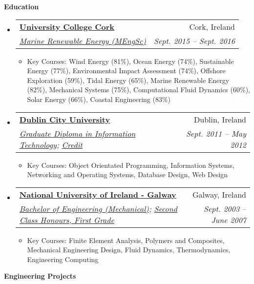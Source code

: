 \documentclass[letterpaper,11pt]{article}
\makeatletter
\newcommand{\resitem}[1]{\item #1 \vspace{-2pt}}
\newcommand{\resheading}[1]{{\large \colorbox{mygrey}{\begin{minipage}{\textwidth}{\textbf{#1 \vphantom{p\^{E}}}}\end{minipage}}}}
\newcommand{\ressubheading}[4]{
\begin{tabular*}{6.5in}{l@{\extracolsep{\fill}}r}
		\textbf{#1} & #2 \\
		\textit{#3} & \textit{#4} \\
\end{tabular*}\vspace{-6pt}}
\makeatother
\begin{document}

\resheading{Education}
	\begin{itemize}
    \item
      \ressubheading{\href{http://www.ucc.ie}{University College Cork}}{Cork, Ireland}{\href{http://www.ucc.ie/en/ckr51/}{Marine Renewable Energy (MEngSc)}}
      {Sept. 2015 -- Sept. 2016}
        { \footnotesize
        \begin{itemize}
        \resitem{Key Courses: Wind Energy (81\%), Ocean Energy (74\%), Sustainable Energy (77\%), Environmental Impact Assessment (74\%), Offshore Exploration (59\%), Tidal Energy (65\%), Marine Renewable Energy (82\%), Mechanical Systems (75\%), Computational Fluid Dynamics (60\%), Solar Energy (66\%), Coastal Engineering (83\%)}
        \end{itemize}
        }

    \item
      \ressubheading{\href{http://www.dcu.ie}{Dublin City University}}{Dublin, Ireland}{\href{https://www.dcu.ie/prospective/deginfo.php?classname=GDF\&originating_school=40}{Graduate Diploma in Information Technology};
      \href{http://peterarmstrong.ie/cv/grad_dip_it_transcript.pdf}{Credit}}
      {Sept. 2011 -- May 2012}
        { \footnotesize
        \begin{itemize}
        \resitem{Key Courses: Object Orientated Programming, Information Systems, Networking and Operating Systems, Database Design, Web Design}
        \end{itemize}
        }

		\item
			\ressubheading{\href{http://www.nuigalway.ie}{National University of Ireland - Galway}}{Galway, Ireland}
			{\href{http://www.nuigalway.ie/courses/undergraduate-courses/mechanical-engineering.html}{Bachelor of Engineering (Mechanical)}; 
			\href{http://peterarmstrong.ie/cv/mech_eng_transcript.jpg}{Second Class Honours, First Grade}}
      {Sept. 2003 -- June 2007}
				{ \footnotesize
				\begin{itemize}
					\resitem{Key Courses: Finite Element Analysis, Polymers and Composites, Mechanical Engineering Design, Fluid Dynamics, Thermodynamics, Engineering Computing }
				\end{itemize}
				}

	\end{itemize} %

\resheading{Engineering Projects}
\end{document}
